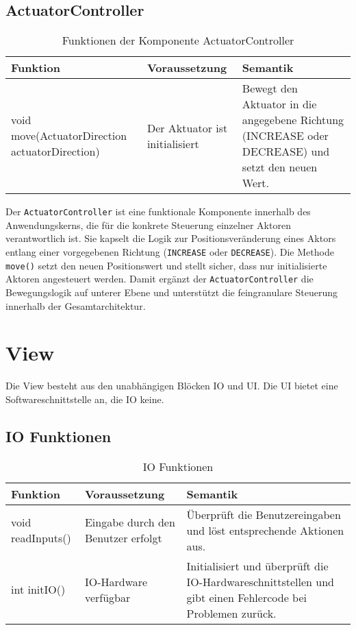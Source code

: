     \subsection{ActuatorController}
        \begin{table}[h!]
            \centering
            \begin{tabular}{|p{5cm}|p{5cm}|p{5cm}|}
                \hline
                \textbf{Funktion} & \textbf{Voraussetzung} & \textbf{Semantik} \\
                \hline
                void move(ActuatorDirection actuatorDirection) & Der Aktuator ist initialisiert & Bewegt den Aktuator in die angegebene Richtung (INCREASE oder DECREASE) und setzt den neuen Wert. \\
                \hline
            \end{tabular}
            \caption{Funktionen der Komponente ActuatorController}
            \label{tab:ActuatorController}
        \end{table}
Der \texttt{ActuatorController} ist eine funktionale Komponente innerhalb des Anwendungskerns, die für die konkrete Steuerung einzelner Aktoren verantwortlich ist. 
Sie kapselt die Logik zur Positionsveränderung eines Aktors entlang einer vorgegebenen Richtung (\texttt{INCREASE} oder \texttt{DECREASE}). Die Methode \texttt{move()} setzt den neuen Positionswert und stellt sicher, dass nur initialisierte Aktoren angesteuert werden. 
Damit ergänzt der \texttt{ActuatorController} die Bewegungslogik auf unterer Ebene und unterstützt die feingranulare Steuerung innerhalb der Gesamtarchitektur.

\section{View}
Die View besteht aus den unabhängigen Blöcken IO und UI. Die UI bietet eine Softwareschnittstelle an, die IO keine.

\subsection{IO Funktionen}
\begin{table}[h!]
    \centering
    \begin{tabular}{|p{5cm}|p{5cm}|p{5cm}|}
        \hline
        \textbf{Funktion} & \textbf{Voraussetzung} & \textbf{Semantik} \\
        \hline
        void readInputs() & Eingabe durch den Benutzer erfolgt & Überprüft die Benutzereingaben und löst entsprechende Aktionen aus. \\
        \hline
        int initIO() & IO-Hardware verfügbar & Initialisiert und überprüft die IO-Hardwareschnittstellen und gibt einen Fehlercode bei Problemen zurück. \\
        \hline
    \end{tabular}
    \caption{IO Funktionen}
    \label{tab:IOFunktionen}
\end{table}

